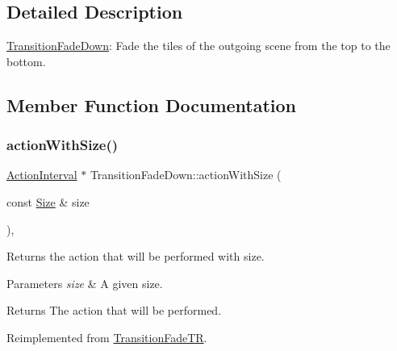 \subsection{Detailed Description}
\hyperlink{classTransitionFadeDown}{Transition\+Fade\+Down}\+: Fade the tiles of the outgoing scene from the top to the bottom. 

\subsection{Member Function Documentation}
\mbox{\label{classTransitionFadeDown_aa0c84d6a674134fc9a24d9e796f7cc0b}} 
\subsubsection{\texorpdfstring{action\+With\+Size()}{actionWithSize()}\hspace{0.1cm}{\footnotesize\ttfamily [1/2]}}
{\footnotesize\ttfamily \hyperlink{classActionInterval}{Action\+Interval} $\ast$ Transition\+Fade\+Down\+::action\+With\+Size (\begin{DoxyParamCaption}\item[{const \hyperlink{classSize}{Size} \&}]{size }\end{DoxyParamCaption})\hspace{0.3cm}{\ttfamily [override]}, {\ttfamily [virtual]}}

Returns the action that will be performed with size.


\begin{DoxyParams}{Parameters}
{\em size} & A given size. \\
\hline
\end{DoxyParams}
\begin{DoxyReturn}{Returns}
The action that will be performed. 
\end{DoxyReturn}


Reimplemented from \hyperlink{classTransitionFadeTR_a371a39553335050a845c6743d20aac00}{Transition\+Fade\+TR}.

\mbox{\label{classTransitionFadeDown_a7cc0da579b09b7595ea875acdccb94e3}} 
